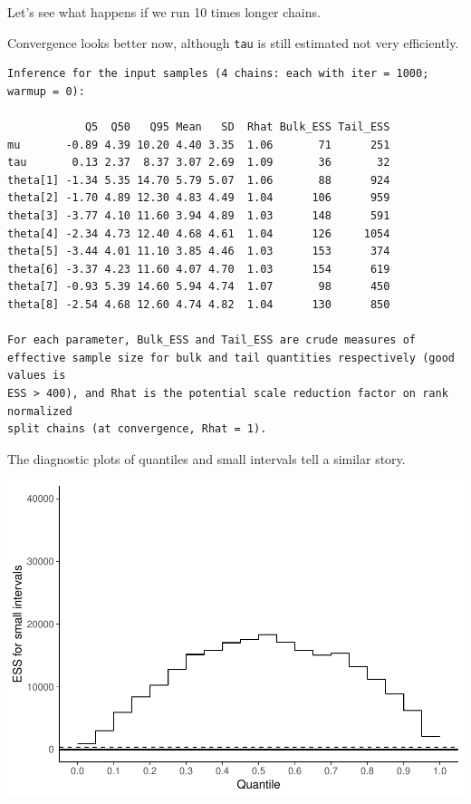 \documentclass[american,]{article}
\begin{document}
Let's see what happens if we run 10 times longer chains.

Convergence looks better now, although \texttt{tau} is still estimated
not very efficiently.

\begin{verbatim}
Inference for the input samples (4 chains: each with iter = 1000; warmup = 0):

            Q5  Q50   Q95 Mean   SD  Rhat Bulk_ESS Tail_ESS
mu       -0.89 4.39 10.20 4.40 3.35  1.06       71      251
tau       0.13 2.37  8.37 3.07 2.69  1.09       36       32
theta[1] -1.34 5.35 14.70 5.79 5.07  1.06       88      924
theta[2] -1.70 4.89 12.30 4.83 4.49  1.04      106      959
theta[3] -3.77 4.10 11.60 3.94 4.89  1.03      148      591
theta[4] -2.34 4.73 12.40 4.68 4.61  1.04      126     1054
theta[5] -3.44 4.01 11.10 3.85 4.46  1.03      153      374
theta[6] -3.37 4.23 11.60 4.07 4.70  1.03      154      619
theta[7] -0.93 5.39 14.60 5.94 4.74  1.07       98      450
theta[8] -2.54 4.68 12.60 4.74 4.82  1.04      130      850

For each parameter, Bulk_ESS and Tail_ESS are crude measures of 
effective sample size for bulk and tail quantities respectively (good values is 
ESS > 400), and Rhat is the potential scale reduction factor on rank normalized
split chains (at convergence, Rhat = 1).
\end{verbatim}

The diagnostic plots of quantiles and small intervals tell a similar
story.

\includegraphics{graphics/local-ess-jags-cp-tau-longer-1.pdf}
\end{document}
